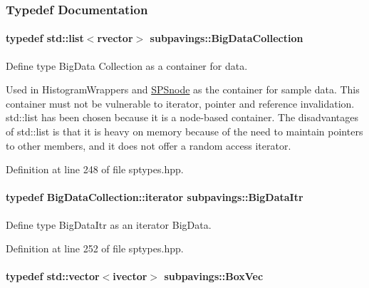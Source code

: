 \subsubsection{\-Typedef \-Documentation}
\hypertarget{namespacesubpavings_aa79f33663da92502ce1a37f3fd1f3d85}{
\paragraph[{\-Big\-Data\-Collection}]{\setlength{\rightskip}{0pt plus 5cm}typedef std\-::list$<$rvector$>$ {\bf subpavings\-::\-Big\-Data\-Collection}}}\label{namespacesubpavings_aa79f33663da92502ce1a37f3fd1f3d85}


\-Define type \-Big\-Data \-Collection as a container for data. 

\-Used in \-Histogram\-Wrappers and \hyperlink{classsubpavings_1_1SPSnode}{\-S\-P\-Snode} as the container for sample data. \-This container must not be vulnerable to iterator, pointer and reference invalidation. std\-::list has been chosen because it is a node-\/based container. \-The disadvantages of std\-::list is that it is heavy on memory because of the need to maintain pointers to other members, and it does not offer a random access iterator. 

\-Definition at line 248 of file sptypes.\-hpp.

\hypertarget{namespacesubpavings_a8792314c11b28ac2b8c4c85c47526f3a}{
\paragraph[{\-Big\-Data\-Itr}]{\setlength{\rightskip}{0pt plus 5cm}typedef \-Big\-Data\-Collection\-::iterator {\bf subpavings\-::\-Big\-Data\-Itr}}}\label{namespacesubpavings_a8792314c11b28ac2b8c4c85c47526f3a}


\-Define type \-Big\-Data\-Itr as an iterator \-Big\-Data. 



\-Definition at line 252 of file sptypes.\-hpp.

\hypertarget{namespacesubpavings_a322c2661740f6e6cc815fff0bfbd2623}{
\paragraph[{\-Box\-Vec}]{\setlength{\rightskip}{0pt plus 5cm}typedef std\-::vector$<$ivector$>$ {\bf subpavings\-::\-Box\-Vec}}}\label{namespacesubpavings_a322c2661740f6e6cc815fff0bfbd2623}


